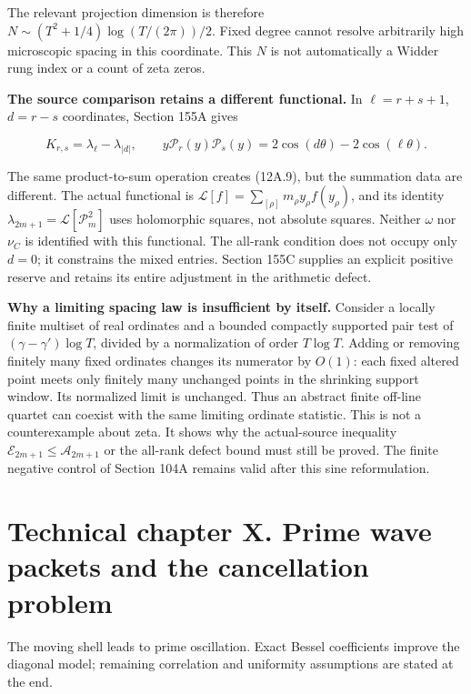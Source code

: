 \documentclass[
  11pt,
]{book}
\begin{document}
The relevant projection dimension is therefore
\(N\sim(T^2+1/4)\log(T/(2\pi))/2\). Fixed degree cannot resolve
arbitrarily high microscopic spacing in this coordinate. This \(N\) is
not automatically a Widder rung index or a count of zeta zeros.

\textbf{The source comparison retains a different functional.} In
\(\ell=r+s+1\), \(d=r-s\) coordinates, Section 155A gives

\[
 K_{r,s}=\lambda_\ell-\lambda_{|d|},\qquad
 y\mathcal P_r(y)\mathcal P_s(y)
 =2\cos(d\theta)-2\cos(\ell\theta).
\tag{61A.5}
\]

The same product-to-sum operation creates (12A.9), but the summation
data are different. The actual functional is
\(\mathcal L[f]=\sum_{[\rho]}m_\rho y_\rho f(y_\rho)\), and its identity
\(\lambda_{2m+1}=\mathcal L[\mathcal P_m^2]\) uses holomorphic squares,
not absolute squares. Neither \(\omega\) nor \(\nu_C\) is identified
with this functional. The all-rank condition does not occupy only
\(d=0\); it constrains the mixed entries. Section 155C supplies an
explicit positive reserve and retains its entire adjustment in the
arithmetic defect.

\textbf{Why a limiting spacing law is insufficient by itself.} Consider
a locally finite multiset of real ordinates and a bounded compactly
supported pair test of \((\gamma-\gamma')\log T\), divided by a
normalization of order \(T\log T\). Adding or removing finitely many
fixed ordinates changes its numerator by \(O(1)\): each fixed altered
point meets only finitely many unchanged points in the shrinking support
window. Its normalized limit is unchanged. Thus an abstract finite
off-line quartet can coexist with the same limiting ordinate statistic.
This is not a counterexample about zeta. It shows why the actual-source
inequality \(\mathcal E_{2m+1}\le\mathcal A_{2m+1}\) or the all-rank
defect bound must still be proved. The finite negative control of
Section 104A remains valid after this sine reformulation.


\chapter{Technical chapter X. Prime wave packets and the cancellation
problem}\label{technical-chapter-x.-prime-wave-packets-and-the-cancellation-problem}

The moving shell leads to prime oscillation. Exact Bessel coefficients
improve the diagonal model; remaining correlation and uniformity
assumptions are stated at the end.
\end{document}
